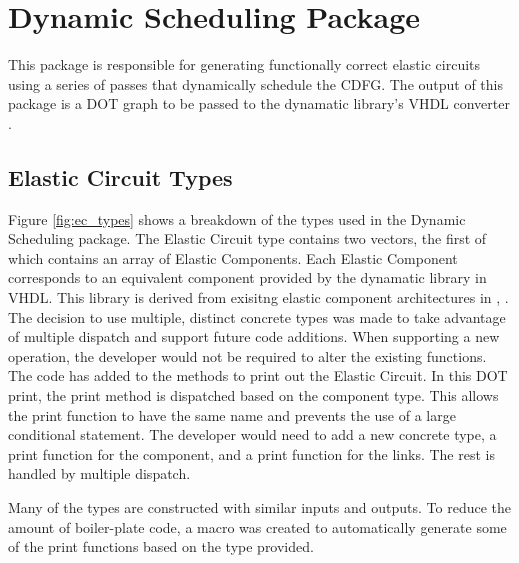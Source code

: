 \pagebreak

\section{Dynamic Scheduling Package}
This package is responsible for generating functionally correct elastic circuits using a series of passes that dynamically schedule the CDFG. The output of this package is a DOT graph to be passed to the dynamatic library's VHDL converter \cite{dtv}.

\subsection{Elastic Circuit Types}

Figure \ref{fig:ec_types} shows a breakdown of the types used in the Dynamic Scheduling package. The Elastic Circuit type contains two vectors, the first of which contains an array of Elastic Components. Each Elastic Component corresponds to an equivalent component provided by the dynamatic library in VHDL. This library is derived from exisitng elastic component architectures in \cite{elastic_cgra}, \cite{elastic_sync}. The decision to use multiple, distinct concrete types was made to take advantage of multiple dispatch and support future code additions. When supporting a new operation, the developer would not be required to alter the existing functions. The code has added to the  methods to print out the Elastic Circuit. In this DOT print, the print method is dispatched based on the component type. This allows the print function to have the same name and prevents the use of a large conditional statement. The developer would need to add a new concrete type, a print function for the component, and a print function for the links. The rest is handled by multiple dispatch.

Many of the types are constructed with similar inputs and outputs. To reduce the amount of boiler-plate code, a macro was created to automatically generate some of the print functions based on the type provided. 
		
